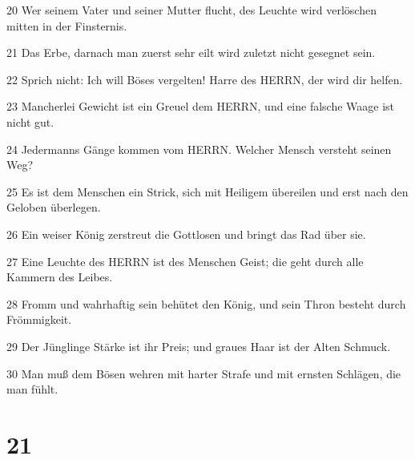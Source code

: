 \par 20 Wer seinem Vater und seiner Mutter flucht, des Leuchte wird verlöschen mitten in der Finsternis.
\par 21 Das Erbe, darnach man zuerst sehr eilt wird zuletzt nicht gesegnet sein.
\par 22 Sprich nicht: Ich will Böses vergelten! Harre des HERRN, der wird dir helfen.
\par 23 Mancherlei Gewicht ist ein Greuel dem HERRN, und eine falsche Waage ist nicht gut.
\par 24 Jedermanns Gänge kommen vom HERRN. Welcher Mensch versteht seinen Weg?
\par 25 Es ist dem Menschen ein Strick, sich mit Heiligem übereilen und erst nach den Geloben überlegen.
\par 26 Ein weiser König zerstreut die Gottlosen und bringt das Rad über sie.
\par 27 Eine Leuchte des HERRN ist des Menschen Geist; die geht durch alle Kammern des Leibes.
\par 28 Fromm und wahrhaftig sein behütet den König, und sein Thron besteht durch Frömmigkeit.
\par 29 Der Jünglinge Stärke ist ihr Preis; und graues Haar ist der Alten Schmuck.
\par 30 Man muß dem Bösen wehren mit harter Strafe und mit ernsten Schlägen, die man fühlt.

\chapter{21}


